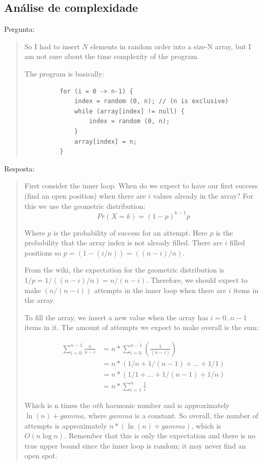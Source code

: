 \documentclass[12pt,a4paper]{article}
\begin{document}
\subsection{Análise de complexidade}

Pergunta:

\begin{quote}
	So I had to insert $N$ elements in random order into a size-N array, but I am not sure about the time complexity of the program.

	The program is basically:
	\begin{figure}[!h]
	\begin{BVerbatim}
	for (i = 0 -> n-1) {
		index = random (0, n); // (n is exclusive)
		while (array[index] != null) {
			index = random (0, n);
		}
		array[index] = n;
	}
	\end{BVerbatim}
	\end{figure}
\end{quote}

Resposta:

\begin{quote}
	First consider the inner loop. When do we expect to have our first success (find an open position) when there are $i$ values already in the array? For this we use the geometric distribution:
	\[Pr(X = k) = (1-p)^{k-1} p\]
	
	Where $p$ is the probability of success for an attempt. Here $p$ is the probability that the array index is not already filled. There are $i$ filled positions so $p = (1 - (i/n)) = ((n - i)/n)$.
	
	From the wiki, the expectation for the geometric distribution is $1/p = 1 / ((n-i)/n) = n/(n-i)$. Therefore, we should expect to make $(n / (n - i))$ attempts in the inner loop when there are $i$ items in the array.
	
	To fill the array, we insert a new value when the array has $i=0..n-1$ items in it. The amount of attempts we expect to make overall is the sum:
	
	\[ \begin{split}
	\sum_{i=0}^{n-1} \frac{n}{n-i}&= n * \sum_{i=0}^{n-1} (\frac{1}{(n-i)})\\
	&= n * (1/n + 1/(n-1) + ... + 1/1) \\
	&= n * (1/1 + ... + 1/(n-1) + 1/n) \\
	&= n * \sum_{i=1}^{n} \frac{1}{i}
	\end{split} \]
	
	Which is n times the $nth$ harmonic number and is approximately $\ln(n) + gamma$, where $gamma$ is a constant. So overall, the number of attempts is approximately $n * (\ln(n) + gamma)$, which is $O(n \log n)$. Remember that this is only the expectation and there is no true upper bound since the inner loop is random; it may never find an open spot.
\end{quote}
\end{document}
